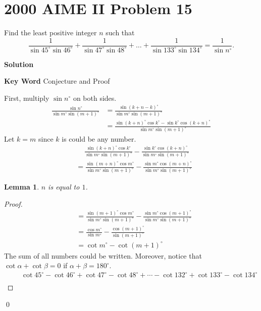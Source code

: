 \documentclass{article}
\newtheorem*{lemma*}{Lemma}
\newenvironment{solution}{\begin{trivlist}\item[]{\bf Solution}}{\qed \end{trivlist}}
\begin{document}
\section*{2000 AIME II Problem 15}
Find the least positive integer $n$ such that
\[
\frac{1}{\sin45^{\circ}\sin46^{\circ}} + \frac{1}{\sin47^{\circ}\sin48^{\circ}} + \dots + \frac{1}{\sin133^{\circ}\sin134^{\circ}} = \frac{1}{\sin n^{\circ}}.
\]
\begin{solution}

\medskip

\noindent
\textbf{Key Word} Conjecture and Proof

\medskip

\noindent
First, multiply $\sin n^{\circ}$ on both sides.
\begin{align*}
    \frac{\sin n^\circ}{\sin m^\circ \sin (m+1)^\circ}
    &= \frac{\sin (k+n-k)^\circ}{\sin m^\circ \sin (m+1)^\circ} \\
    &= \frac{\sin (k+n)^\circ \cos k^\circ - \sin k^\circ \cos (k+n)^\circ}{\sin m^\circ \sin (m+1)^\circ}
\end{align*}
Let $k = m$ since $k$ is could be any number.
\begin{align*}
    &\quad \ \frac{\sin (k+n)^\circ \cos k^\circ}{\sin m^\circ \sin (m+1)^\circ} - \frac{\sin k^\circ \cos (k+n)^\circ}{\sin m^\circ \sin (m+1)^\circ} \\[0.5em]
    &=\frac{\sin (m+n)^\circ \cos m^\circ}{\sin m^\circ \sin (m+1)^\circ} - \frac{\sin m^\circ \cos (m+n)^\circ}{\sin m^\circ \sin (m+1)^\circ}
\end{align*}
\begin{lemma*}
    $n$ is equal to $1$.
\end{lemma*}
\begin{proof}
\begin{align*}
    &=\frac{\sin (m+1)^\circ \cos m^\circ}{\sin m^\circ \sin (m+1)^\circ} - \frac{\sin m^\circ \cos (m+1)^\circ}{\sin m^\circ \sin (m+1)^\circ} \\[0.5em]
    &=\frac{\cos m^\circ}{\sin m^\circ} - \frac{\cos (m+1)^\circ}{\sin (m+1)^\circ} \\[0.5em]
    &= \cot m^\circ - \cot (m+1)^\circ
\end{align*}
The sum of all numbers could be written. Moreover, notice that $\cot\alpha + \cot\beta = 0$ if $\alpha + \beta = 180^\circ$.
\begin{align*}
    &\quad \ \cot 45^\circ - \cot 46^\circ + \cot 47^\circ - \cot 48^\circ + \cdots - \cot 132^\circ + \cot 133^\circ - \cot 134^\circ \\

\end{align*}
\end{proof}
\end{solution}
\end{document}
